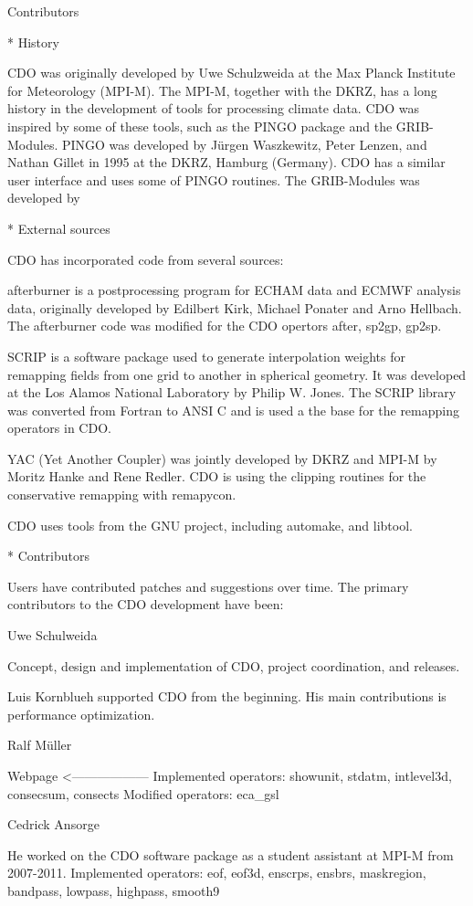 Contributors

* History

CDO was originally developed by Uwe Schulzweida at the Max Planck Institute for Meteorology (MPI-M).
The MPI-M, together with the DKRZ, has a long history in the development of tools for processing climate data.
CDO was inspired by some of these tools, such as the PINGO package and the GRIB-Modules. 
PINGO was developed by Jürgen Waszkewitz, Peter Lenzen, and Nathan Gillet in 1995 at the DKRZ, Hamburg (Germany).
CDO has a similar user interface and uses some of PINGO routines.
The GRIB-Modules was developed by 

* External sources

CDO has incorporated code from several sources:

afterburner is a postprocessing program for ECHAM data and ECMWF analysis data,
originally developed by Edilbert Kirk, Michael Ponater and Arno Hellbach.
The afterburner code was modified for the CDO opertors after, sp2gp, gp2sp.

SCRIP is a software package used to generate interpolation weights for remapping
fields from one grid to another in spherical geometry.
It was developed at the Los Alamos National Laboratory by Philip W. Jones.
The SCRIP library was converted from Fortran to ANSI C and is used a
the base for the remapping operators in CDO.

YAC (Yet Another Coupler) was jointly developed by DKRZ and MPI-M by Moritz Hanke and Rene Redler.
CDO is using the clipping routines for the conservative remapping with remapycon.

CDO uses tools from the GNU project, including automake, and libtool. 

* Contributors

Users have contributed patches and suggestions over time.
The primary contributors to the CDO development have been: 

Uwe Schulweida

Concept, design and implementation of CDO, project coordination, and releases.

Luis Kornblueh
supported CDO from the beginning. His main contributions is performance optimization.

Ralf Müller

Webpage <------------------
Implemented operators: showunit, stdatm, intlevel3d, consecsum, consects
Modified operators: eca_gsl

Cedrick Ansorge

He worked on the CDO software package as a student assistant at MPI-M from 2007-2011.
Implemented operators: eof, eof3d, enscrps, ensbrs, maskregion, bandpass, lowpass, highpass, smooth9

